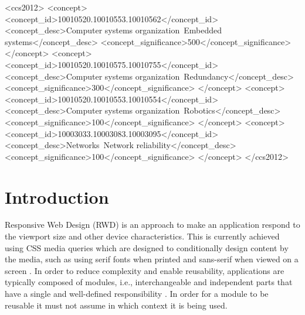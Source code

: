 \documentclass[sigconf,9pt]{acmart}
\begin{document}
%
%
\begin{CCSXML}
<ccs2012>
 <concept>
  <concept_id>10010520.10010553.10010562</concept_id>
  <concept_desc>Computer systems organization~Embedded systems</concept_desc>
  <concept_significance>500</concept_significance>
 </concept>
 <concept>
  <concept_id>10010520.10010575.10010755</concept_id>
  <concept_desc>Computer systems organization~Redundancy</concept_desc>
  <concept_significance>300</concept_significance>
 </concept>
 <concept>
  <concept_id>10010520.10010553.10010554</concept_id>
  <concept_desc>Computer systems organization~Robotics</concept_desc>
  <concept_significance>100</concept_significance>
 </concept>
 <concept>
  <concept_id>10003033.10003083.10003095</concept_id>
  <concept_desc>Networks~Network reliability</concept_desc>
  <concept_significance>100</concept_significance>
 </concept>
</ccs2012>
\end{CCSXML}





\maketitle

\section{Introduction}
  Responsive Web Design (RWD) is an approach to make an application respond to the viewport size and other device characteristics.
  This is currently achieved using CSS media queries which are designed to conditionally design content by the media, such as using serif fonts when printed and sans-serif when viewed on a screen \cite{w3c_css_mq}.
  In order to reduce complexity and enable reusability, applications are typically composed of modules, i.e., interchangeable and independent parts that have a single and well-defined responsibility \cite{parnas1972criteria}.
  In order for a module to be reusable it must not assume in which context it is being used.
\end{document}
